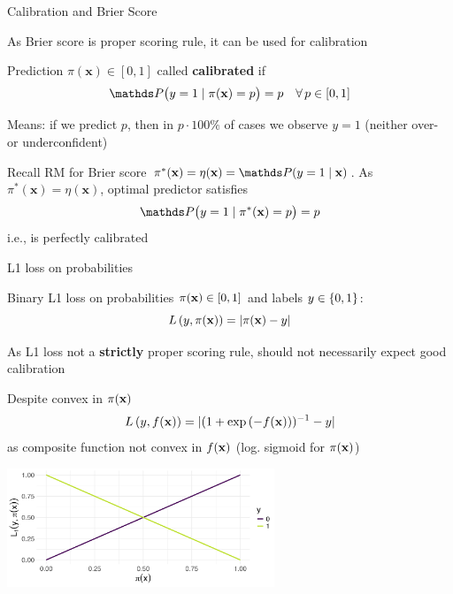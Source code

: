 \documentclass[11pt,compress,t,notes=noshow, xcolor=table]{beamer}
\begin{document}
\begin{vbframe}{Calibration and Brier Score}

\begin{itemizeL}
    \item As Brier score is proper scoring rule, it can be used for calibration
    \item Prediction $\pi(\mathbf{x})\in[0,1]$ called \textbf{calibrated} if 
$$\P\bigl(y=1 \mid \pi(\mathbf{x})=p\bigr)=p \quad \forall\, p\in[0,1]$$
    \item Means: if we predict $p$, then in $p \cdot 100\%$ of cases we observe $y=1$ (neither over- or underconfident)
    \item Recall RM for Brier score $\pi^*(\mathbf{x}) = \eta(\mathbf{x}) = \P(y=1 \mid \mathbf{x})$. As \(\pi^*(\mathbf{x})=\eta(\mathbf{x})\), optimal predictor satisfies $$\P\bigl(y=1 \mid \pi^*(\mathbf{x})=p\bigr)=p$$
i.e., is perfectly calibrated
\end{itemizeL}

\end{vbframe}

\begin{vbframe}{L1 loss on probabilities}
\begin{itemizeM}
    \item Binary L1 loss on probabilities $\pi(\mathbf{x}) \in [0, 1]$ and labels $y \in \{0, 1\}$: $$L\left(y, \pi(\mathbf{x})\right) = |\pi(\mathbf{x}) - y|$$
    \item As L1 loss not a \textbf{strictly} proper scoring rule, should not necessarily expect good calibration
    \item Despite convex in $\pi(\mathbf{x})$ $$L\left(y, f(\mathbf{x})\right)=|(1+\exp{(-f(\mathbf{x}))})^{-1}-y|$$ as composite function not convex in $f(\mathbf{x})$ (log. sigmoid for $\pi(\mathbf{x})$)
\end{itemizeM}

\vspace{-0.2cm}
\begin{center}
\includegraphics[width = 0.6\textwidth]{figure/l1_loss.png}
\end{center}


\end{vbframe}





\endlecture
\end{document}
